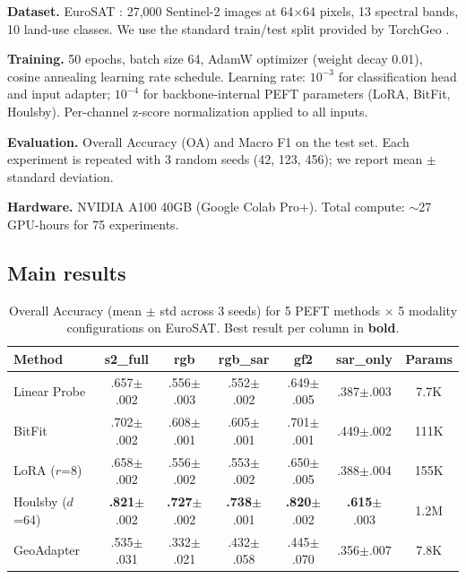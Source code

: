 \documentclass{article}
\begin{document}
\textbf{Dataset.} EuroSAT \citep{helber2019eurosat}: 27,000 Sentinel-2 images at 64$\times$64 pixels, 13 spectral bands, 10 land-use classes. We use the standard train/test split provided by TorchGeo \citep{stewart2024torchgeo}.

\textbf{Training.} 50 epochs, batch size 64, AdamW optimizer (weight decay 0.01), cosine annealing learning rate schedule. Learning rate: $10^{-3}$ for classification head and input adapter; $10^{-4}$ for backbone-internal PEFT parameters (LoRA, BitFit, Houlsby). Per-channel z-score normalization applied to all inputs.

\textbf{Evaluation.} Overall Accuracy (OA) and Macro F1 on the test set. Each experiment is repeated with 3 random seeds (42, 123, 456); we report mean $\pm$ standard deviation.

\textbf{Hardware.} NVIDIA A100 40GB (Google Colab Pro+). Total compute: $\sim$27 GPU-hours for 75 experiments.

\subsection{Main results}

\begin{table}[htbp]
\centering
\caption{Overall Accuracy (mean $\pm$ std across 3 seeds) for 5 PEFT methods $\times$ 5 modality configurations on EuroSAT. Best result per column in \textbf{bold}.}
\label{tab:main}
\begin{tabular}{lcccccc}
\toprule
Method & s2\_full & rgb & rgb\_sar & gf2 & sar\_only & Params \\
\midrule
Linear Probe & .657{\scriptsize$\pm$.002} & .556{\scriptsize$\pm$.003} & .552{\scriptsize$\pm$.002} & .649{\scriptsize$\pm$.005} & .387{\scriptsize$\pm$.003} & 7.7K \\
BitFit & .702{\scriptsize$\pm$.002} & .608{\scriptsize$\pm$.001} & .605{\scriptsize$\pm$.001} & .701{\scriptsize$\pm$.001} & .449{\scriptsize$\pm$.002} & 111K \\
LoRA ($r$=8) & .658{\scriptsize$\pm$.002} & .556{\scriptsize$\pm$.002} & .553{\scriptsize$\pm$.002} & .650{\scriptsize$\pm$.005} & .388{\scriptsize$\pm$.004} & 155K \\
Houlsby ($d$=64) & \textbf{.821}{\scriptsize$\pm$.002} & \textbf{.727}{\scriptsize$\pm$.002} & \textbf{.738}{\scriptsize$\pm$.001} & \textbf{.820}{\scriptsize$\pm$.002} & \textbf{.615}{\scriptsize$\pm$.003} & 1.2M \\
GeoAdapter & .535{\scriptsize$\pm$.031} & .332{\scriptsize$\pm$.021} & .432{\scriptsize$\pm$.058} & .445{\scriptsize$\pm$.070} & .356{\scriptsize$\pm$.007} & 7.8K \\
\bottomrule
\end{tabular}
\end{table}
\end{document}
